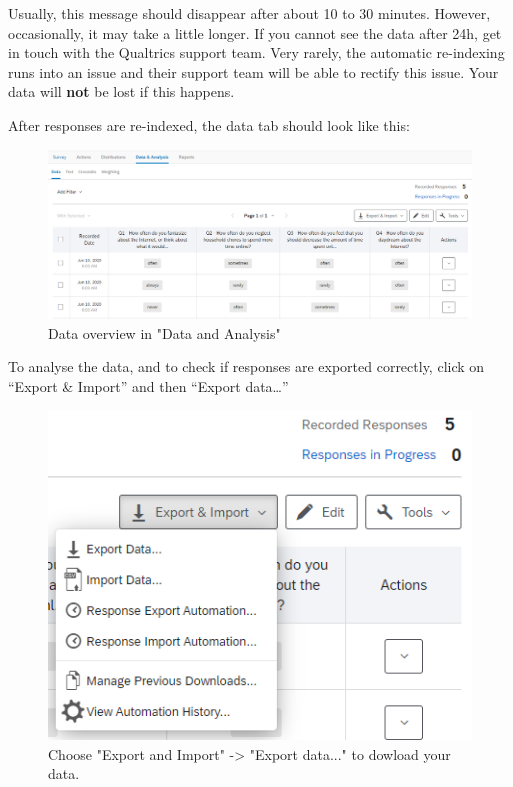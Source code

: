 \documentclass[
]{book}
\begin{document}
Usually, this message should disappear after about 10 to 30 minutes. However, occasionally, it may take a little longer. If you cannot see the data after 24h, get in touch with the Qualtrics support team. Very rarely, the automatic re-indexing runs into an issue and their support team will be able to rectify this issue. Your data will \textbf{not} be lost if this happens.

After responses are re-indexed, the data tab should look like this:

\begin{figure}

{\centering \includegraphics[width=0.99\linewidth]{images/Qualtrics/13checkdata3} 

}

\caption{Data overview in "Data and Analysis"}\label{fig:Figure11-13}
\end{figure}

To analyse the data, and to check if responses are exported correctly, click on ``Export \& Import'' and then ``Export data\ldots{}''

\begin{figure}

{\centering \includegraphics[width=0.85\linewidth]{images/Qualtrics/14exportdata} 

}

\caption{Choose "Export and Import" -> "Export data..." to dowload your data.}\label{fig:Figure11-14}
\end{figure}
\end{document}
